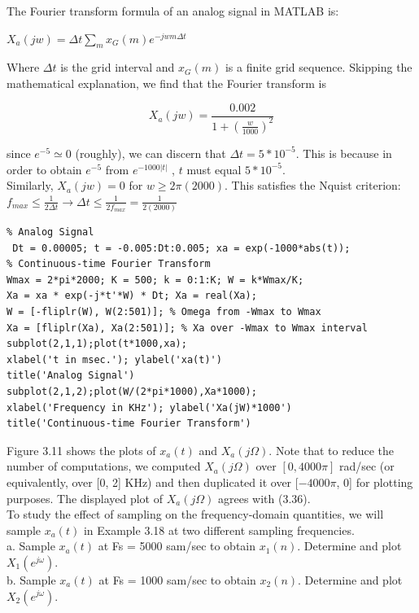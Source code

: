 \documentclass{article}
\begin{document}
\vspace{1em}
The Fourier transform formula of an analog signal in MATLAB is:
\begin{center}
$X_a(jw) = \Delta t \sum_m x_G(m)e^{-jwm\Delta t}$
\end{center}
Where $\Delta t $ is the grid interval and $x_G(m)$ is a finite grid sequence.
Skipping the mathematical explanation, we find that the Fourier transform is 
\begin{center}
$$X_a(jw)= \frac{0.002}{1+(\frac{w}{1000})^2}$$
\end{center}
since $e^{-5} \simeq 0$ (roughly), we can discern that $\Delta t =5*10^{-5}$.
This is because in order to obtain $e^{-5}$ from $e^{-1000|t|}$ , $ t$ must equal $5*10^{-5}$. \\
\vspace{1em}
Similarly, $X_a(jw) = 0$ for $w \geq 2\pi(2000)$. This satisfies the Nquist criterion: $f_{max} \leq \frac{1}{2 \Delta t}  \rightarrow \Delta t \leq \frac{1}{2f_{max}}=\frac{1}{2(2000)}$
\begin{lstlisting}
% Analog Signal
 Dt = 0.00005; t = -0.005:Dt:0.005; xa = exp(-1000*abs(t));
% Continuous-time Fourier Transform
Wmax = 2*pi*2000; K = 500; k = 0:1:K; W = k*Wmax/K;
Xa = xa * exp(-j*t'*W) * Dt; Xa = real(Xa);
W = [-fliplr(W), W(2:501)]; % Omega from -Wmax to Wmax
Xa = [fliplr(Xa), Xa(2:501)]; % Xa over -Wmax to Wmax interval
subplot(2,1,1);plot(t*1000,xa);
xlabel('t in msec.'); ylabel('xa(t)')
title('Analog Signal')
subplot(2,1,2);plot(W/(2*pi*1000),Xa*1000);
xlabel('Frequency in KHz'); ylabel('Xa(jW)*1000')
title('Continuous-time Fourier Transform')    
\end{lstlisting}
Figure 3.11 shows the plots of $x_a(t)$ and $X_a(j\Omega)$. Note that to reduce the number
of computations, we computed $X_a(j\Omega)$ over $[0, 4000\pi]$ rad/sec (or equivalently,
over [0, 2] KHz) and then duplicated it over [$-4000\pi$, 0] for plotting purposes.
The displayed plot of $X_a(j\Omega)$ agrees with (3.36). \\
\vspace{1em}
To study the effect of sampling on the frequency-domain quantities, we will
sample $x_a(t)$ in Example 3.18 at two different sampling frequencies. \\
\vspace{1em}
a. Sample $x_a(t)$ at Fs = 5000 sam/sec to obtain $x_1(n)$. Determine and plot $X_1(e^{j\omega})$. \\
b. Sample $x_a(t)$ at Fs = 1000 sam/sec to obtain $x_2(n)$. Determine and plot $X_2(e^{j\omega})$. \\ 
\end{document}
